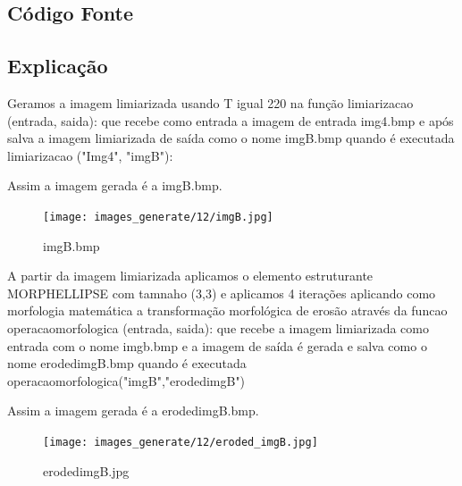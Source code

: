 \documentclass[10pt,a4paper]{article}
\begin{document}
\subsection{Código Fonte}



\subsection{Explicação}

\begin{flushleft}
Geramos a imagem limiarizada usando T igual 220 na função {\ttfamily limiarizacao (entrada, saida):} que recebe como entrada a imagem de entrada img4.bmp e após salva a imagem limiarizada de saída como o nome imgB.bmp quando é executada {\ttfamily limiarizacao ("Img4", "imgB"):} 
\end{flushleft}

\begin{flushleft}
Assim a imagem gerada é a imgB.bmp.
\end{flushleft}

\begin{figure}[H]
    \centering
    \texttt{[image: images\_generate/12/imgB.jpg]}
    \caption{imgB.bmp}
\end{figure}

\begin{flushleft}
A partir da imagem limiarizada aplicamos o elemento estruturante MORPH\textunderscore ELLIPSE com tamnaho (3,3) e aplicamos 4 iterações aplicando como morfologia matemática a transformação morfológica de erosão através da funcao {\ttfamily operacao\textunderscore morfologica (entrada, saida): } que recebe a imagem limiarizada como entrada com o nome imgb.bmp e a imagem de saída é gerada e salva como o nome eroded\textunderscore imgB.bmp quando é executada {\ttfamily operacao\textunderscore morfologica("imgB","eroded\textunderscore imgB")}
\end{flushleft}

\begin{flushleft}
Assim a imagem gerada é a eroded\textunderscore imgB.bmp.
\end{flushleft}

\begin{figure}[H]
    \centering
    \texttt{[image: images\_generate/12/eroded\_imgB.jpg]}
    \caption{eroded\textunderscore imgB.jpg}
\end{figure}
\end{document}
